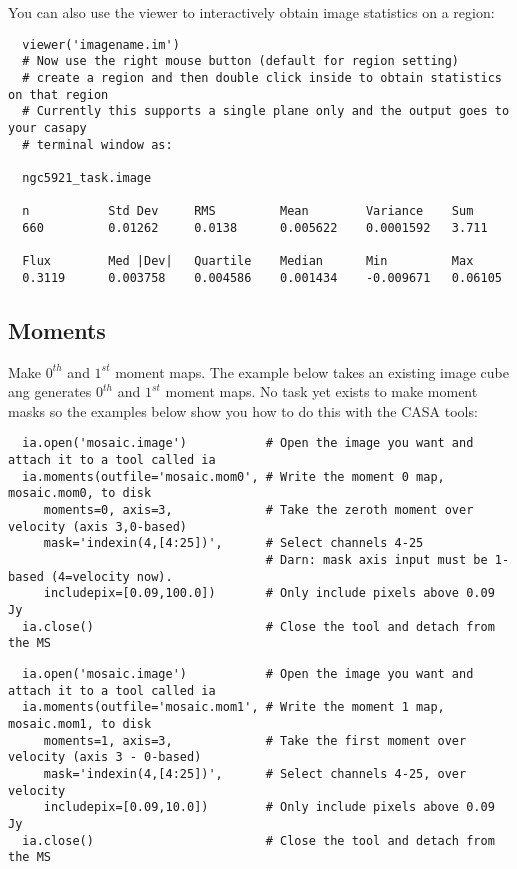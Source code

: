 You can also use the viewer to interactively obtain image statistics on a region:

\small
\begin{verbatim}
  viewer('imagename.im')
  # Now use the right mouse button (default for region setting)
  # create a region and then double click inside to obtain statistics on that region
  # Currently this supports a single plane only and the output goes to your casapy 
  # terminal window as:

  ngc5921_task.image

  n           Std Dev     RMS         Mean        Variance    Sum
  660         0.01262     0.0138      0.005622    0.0001592   3.711     
  
  Flux        Med |Dev|   Quartile    Median      Min         Max
  0.3119      0.003758    0.004586    0.001434    -0.009671   0.06105   
\end{verbatim}
\normalsize

\subsection{Moments}
\label{subsection:image.moments}

Make $0^{th}$ and $1^{st}$ moment maps.  The example below takes an
existing image cube ang generates $0^{th}$ and $1^{st}$ moment maps.
No task yet exists to make moment masks so the examples below show you
how to do this with the CASA tools: 

\small
\begin{verbatim}
  ia.open('mosaic.image')           # Open the image you want and attach it to a tool called ia
  ia.moments(outfile='mosaic.mom0', # Write the moment 0 map, mosaic.mom0, to disk
     moments=0, axis=3,             # Take the zeroth moment over velocity (axis 3,0-based)
     mask='indexin(4,[4:25])',      # Select channels 4-25
                                    # Darn: mask axis input must be 1-based (4=velocity now).  
     includepix=[0.09,100.0])       # Only include pixels above 0.09 Jy
  ia.close()                        # Close the tool and detach from the MS
\end{verbatim}
\normalsize

\small
\begin{verbatim}
  ia.open('mosaic.image')           # Open the image you want and attach it to a tool called ia
  ia.moments(outfile='mosaic.mom1', # Write the moment 1 map, mosaic.mom1, to disk
     moments=1, axis=3,             # Take the first moment over velocity (axis 3 - 0-based)
     mask='indexin(4,[4:25])',      # Select channels 4-25, over velocity
     includepix=[0.09,10.0])        # Only include pixels above 0.09 Jy
  ia.close()                        # Close the tool and detach from the MS
\end{verbatim}
\normalsize

